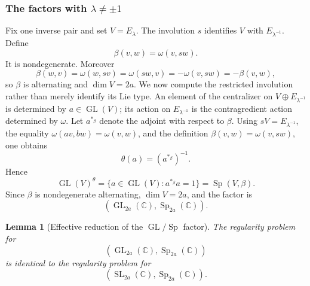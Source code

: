 \documentclass[10pt,a4paper]{amsart}
\numberwithin{equation}{section}
\newtheorem{lemma}[theorem]{Lemma}
\newcommand{\C}{\mathbb C}
\newcommand{\GL}{\operatorname{GL}}
\newcommand{\SL}{\operatorname{SL}}
\newcommand{\Sp}{\operatorname{Sp}}
\begin{document}
\subsubsection{The factors with \texorpdfstring{\(\lambda\neq\pm1\)}{lambda not equal to +/-1}}

Fix one inverse pair and set \(V=E_\lambda\).  The involution \(s\)
identifies \(V\) with \(E_{\lambda^{-1}}\).  Define
\[
\beta(v,w)=\omega(v,sw).
\]
It is nondegenerate.  Moreover
\[
\beta(w,v)
=
\omega(w,sv)
=
\omega(sw,v)
=
-\omega(v,sw)
=
-\beta(v,w),
\]
so \(\beta\) is alternating and \(\dim V=2a\).
We now compute the restricted involution rather than merely identify its
Lie type.  An element of the centralizer on
\(V\oplus E_{\lambda^{-1}}\) is determined by \(a\in\GL(V)\); its action
on \(E_{\lambda^{-1}}\) is the contragredient action determined by
\(\omega\).  Let \(a^{*_{\beta}}\) denote the adjoint with respect to
\(\beta\).  Using \(sV=E_{\lambda^{-1}}\), the equality
\(\omega(av,bw)=\omega(v,w)\), and the definition
\(\beta(v,w)=\omega(v,sw)\), one obtains
\[
  \theta(a)=(a^{*_{\beta}})^{-1}.
\]
Hence
\[
  \GL(V)^\theta
  =\{a\in\GL(V):a^{*_{\beta}}a=1\}
  =\Sp(V,\beta).
\]
Since \(\beta\) is nondegenerate alternating, \(\dim V=2a\), and the
factor is
\[
  (\GL_{2a}(\C),\Sp_{2a}(\C)).
\]

\begin{lemma}[Effective reduction of the \(\GL/\Sp\) factor]
\label{cii:lem:GLSL}
The regularity problem for
\[
(\GL_{2a}(\C),\Sp_{2a}(\C))
\]
is identical to the regularity problem for
\[
(\SL_{2a}(\C),\Sp_{2a}(\C)).
\]
\end{lemma}
\end{document}
